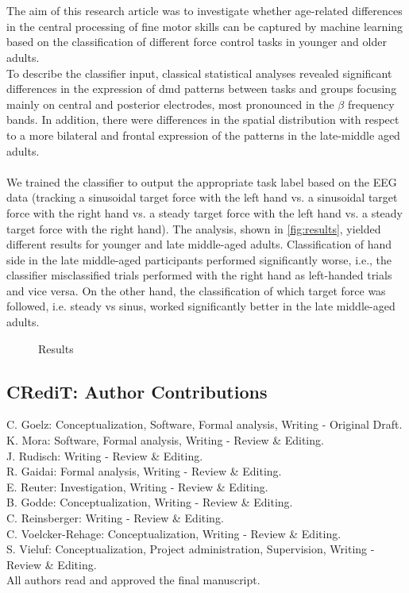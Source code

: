 \\
\\
The aim of this research article was to investigate whether age-related differences in the central processing of fine motor skills can be captured by machine learning based on the classification of different force control tasks in younger and older adults.
\\
To describe the classifier input, classical statistical analyses revealed significant differences in the expression of \gls{dmd} patterns between tasks and groups focusing mainly on central and posterior electrodes, most pronounced in the $\beta$ frequency bands. In addition, there were differences in the spatial distribution with respect to a more bilateral and frontal expression of the patterns in the late-middle aged adults.\\
\\
We trained the classifier to output the appropriate task label based on the EEG data (tracking a sinusoidal target force with the left hand vs. a sinusoidal target force with the right hand vs. a steady target force with the left hand vs. a steady target force with the right hand). The analysis, shown in \autoref{fig:results}, yielded different results for younger and late middle-aged adults. Classification of hand side in the late middle-aged participants performed significantly worse, i.e., the classifier misclassified trials performed with the right hand as left-handed trials and vice versa. On the other hand, the classification of which target force was followed, i.e. steady vs sinus, worked significantly better in the late middle-aged adults. 

\begin{figure}[h]
\begin{center}

\caption[Reuslts]{Results}
\label{fig:results1}
\end{center}
\end{figure}

\subsection*{CRediT: Author Contributions}
C. Goelz: Conceptualization, Software, Formal analysis, Writing - Original Draft.\\
K. Mora: Software, Formal analysis, Writing - Review \& Editing.\\
J. Rudisch: Writing - Review \& Editing.\\
R. Gaidai: Formal analysis, Writing - Review \& Editing.\\ 
E. Reuter: Investigation, Writing - Review \& Editing.\\
B. Godde: Conceptualization, Writing - Review \& Editing.\\ 
C. Reinsberger: Writing - Review \& Editing.\\
C. Voelcker-Rehage: Conceptualization, Writing - Review \& Editing.\\ 
S. Vieluf: Conceptualization, Project administration, Supervision, Writing - Review \& Editing.\\
All authors read and approved the final manuscript.
